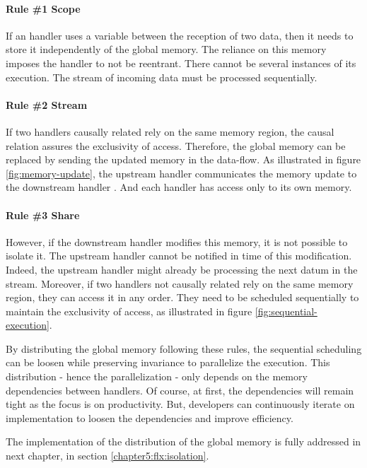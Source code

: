 \paragraph{Rule \#1 Scope}
If an handler uses a variable between the reception of two data, then it needs to store it independently of the global memory.
The reliance on this memory imposes the handler to not be reentrant.
There cannot be several instances of its execution.
The stream of incoming data must be processed sequentially.

\paragraph{Rule \#2 Stream}
If two handlers causally related rely on the same memory region, the causal relation assures the exclusivity of access. Therefore, the global memory can be replaced by sending the updated memory in the data-flow.
As illustrated in figure \ref{fig:memory-update}, the upstream handler  communicates the memory update to the downstream handler .
And each handler has access only to its own memory.

\paragraph{Rule \#3 Share}
However, if the downstream handler modifies this memory, it is not possible to isolate it.
The upstream handler cannot be notified in time of this modification.
Indeed, the upstream handler might already be processing the next datum in the stream.
Moreover, if two handlers not causally related rely on the same memory region, they can access it in any order.
They need to be scheduled sequentially to maintain the exclusivity of access, as illustrated in figure \ref{fig:sequential-execution}.

\separator

By distributing the global memory following these rules, the sequential scheduling can be loosen while preserving invariance to parallelize the execution.
This distribution - hence the parallelization - only depends on the memory dependencies between handlers.
Of course, at first, the dependencies will remain tight as the focus is on productivity.
But, developers can continuously iterate on implementation to loosen the dependencies and improve efficiency.

The implementation of the distribution of the global memory is fully addressed in next chapter, in section \ref{chapter5:flx:isolation}.




